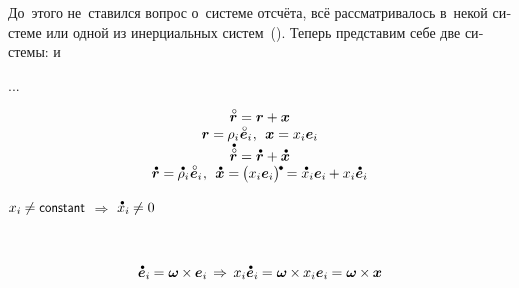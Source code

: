 \begin{otherlanguage}{russian}

До~этого не~ставился вопрос о~системе отсчёта, всё рассматривалось в~некой  системе или одной из инерциальных систем~().
Теперь представим себе две системы:  и~

...

\begin{equation*}
\begin{array}{c}
\initiallocationvector = \locationvector + \bm{x}
\\
\locationvector = \hspace{-0.1ex} \rho_i \hspace{.1ex} \mathcircabove{\bm{e}}_i
\hspace{.1ex} , \:\:
\bm{x} = x_i \bm{e}_i
\\
\mathdotabove{\initiallocationvector} = \mathdotabove{\locationvector} + \mathdotabove{\bm{x}}
\\
\mathdotabove{\locationvector} = \hspace{-0.1ex}
\mathdotabove{\rho}_i \hspace{.1ex} \mathcircabove{\bm{e}}_i
\hspace{.1ex} , \:\:
\mathdotabove{\bm{x}} = \hspace{-0.15ex} \bigl( x_i \bm{e}_i \bigr)^{\hspace{-0.15ex}\tikz[baseline=-0.2ex]\draw[black, fill=black] (0,0) circle (.28ex);} \hspace{-0.15ex}
= \mathdotabove{x}_i \bm{e}_i \hspace{-0.1ex} + x_i \mathdotabove{\bm{e}}_i
\end{array}
\end{equation*}

${x_i \hspace{-0.1ex} \neq \constant}$ $\Rightarrow$ ${\mathdotabove{x}_i \hspace{-0.1ex} \neq 0}$

~

\nopagebreak\vspace{-0.2em}\begin{equation*}
\mathdotabove{\bm{e}}_i \hspace{-0.1ex} = \bm{\omega} \hspace{-0.1ex} \times \hspace{-0.1ex} \bm{e}_i
\hspace{.33ex} \Rightarrow \hspace{.4ex}
x_i \mathdotabove{\bm{e}}_i \hspace{-0.1ex} = \bm{\omega} \hspace{-0.1ex} \times \hspace{-0.1ex} x_i \bm{e}_i \hspace{-0.1ex}
= \bm{\omega} \hspace{-0.1ex} \times \hspace{-0.1ex} \bm{x}
\end{equation*}


\end{otherlanguage}
